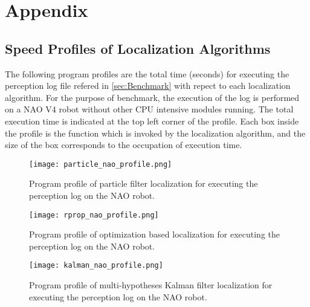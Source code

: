 \chapter{Appendix}\label{testdat}

\section{Speed Profiles of Localization Algorithms}\label{sec:profiles}
The following program profiles are the total time (seconds) for executing the perception log file refered in \autoref{sec:Benchmark} with repect to each localization algorithm. For the purpose of benchmark, the execution of the log is performed on a NAO V4 robot without other CPU intensive modules running. The total execution time is indicated at the top left corner of the profile. Each box inside the profile is the function which is invoked by the localization algorithm, and the size of the box corresponds to the occupation of execution time. 

\begin{figure}[h!]
  \texttt{[image: particle\_nao\_profile.png]}
  \caption{Program profile of particle filter localization for executing the perception log on the NAO robot.}
  \label{fig:profile_partcile}
\end{figure}

\begin{figure}[h!]
  \texttt{[image: rprop\_nao\_profile.png]}
  \caption{Program profile of optimization based localization for executing the perception log on the NAO robot.}
  \label{fig:profile_rprop}
\end{figure}

\begin{figure}[h!]
  \texttt{[image: kalman\_nao\_profile.png]}
  \caption{Program profile of multi-hypotheses Kalman filter localization for executing the perception log on the NAO robot.}
  \label{fig:profile_kalman}
\end{figure}


